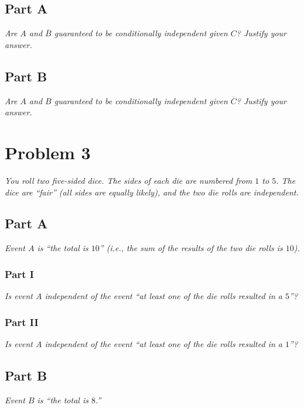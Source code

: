 \documentclass{article}
\begin{document}
\subsection*{Part A}

\textit{Are $ A $ and $ \overline{B} $ guaranteed to be conditionally
independent given $ C $? Justify your answer.}

\subsection*{Part B}

\textit{Are $ A $ and $ B $ guaranteed to be conditionally independent given $
\overline{C} $? Justify your answer.}

\section*{Problem 3}

\textit{You roll two five-sided dice. The sides of each die are numbered from $
1 $ to $ 5 $. The dice are “fair” (all sides are equally likely), and the two
die rolls are independent.}

\subsection*{Part A}

\textit{Event $ A $ is “the total is $ 10 $” (i.e., the sum of the results of
the two die rolls is $ 10 $).}

\subsubsection*{Part I}

\textit{Is event $ A $ independent of the event “at least one of the die rolls
resulted in a $ 5 $”?}

\subsubsection*{Part II}

\textit{Is event $ A $ independent of the event “at least one of the die rolls
resulted in a $ 1 $”?}

\subsection*{Part B}

\textit{Event $ B $ is “the total is $ 8 $.”}
\end{document}
